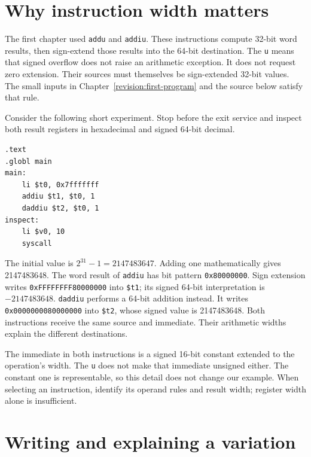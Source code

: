 \section{Why instruction width matters}

The first chapter used \texttt{addu} and \texttt{addiu}. These instructions compute
32-bit word results, then sign-extend those results into the 64-bit destination.
The \texttt{u} means that signed overflow does not raise an arithmetic exception.
It does not request zero extension.
Their sources must themselves be sign-extended 32-bit values. The small inputs
in Chapter~\ref{revision:first-program} and the source below satisfy that rule.

Consider the following short experiment. Stop before the exit service and inspect
both result registers in hexadecimal and signed 64-bit decimal.

\par\noindent\begin{minipage}{\linewidth}
  \begin{verbatim}
.text
.globl main
main:
    li $t0, 0x7fffffff
    addiu $t1, $t0, 1
    daddiu $t2, $t0, 1
inspect:
    li $v0, 10
    syscall
\end{verbatim}
\end{minipage}\par

The initial value is $2^{31}-1=2147483647$. Adding one mathematically gives
2147483648. The word result of \texttt{addiu} has bit pattern
\texttt{0x80000000}. Sign extension writes \texttt{0xFFFFFFFF80000000} into
\texttt{\$t1}; its signed 64-bit interpretation is $-2147483648$.
\texttt{daddiu} performs a 64-bit addition instead. It writes
\texttt{0x0000000080000000} into \texttt{\$t2}, whose signed value is 2147483648.
Both instructions receive the same source and immediate. Their arithmetic widths
explain the different destinations.

The immediate in both instructions is a signed 16-bit constant extended to the
operation's width. The \texttt{u} does not make that immediate unsigned either.
The constant one is representable, so this detail does not change our example.
When selecting an instruction, identify its operand rules and result width;
register width alone is insufficient.

\section{Writing and explaining a variation}

